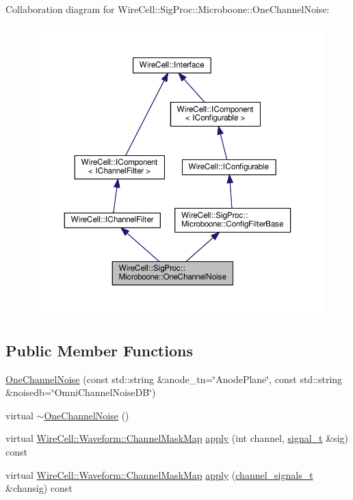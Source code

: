 Collaboration diagram for Wire\+Cell\+:\+:Sig\+Proc\+:\+:Microboone\+:\+:One\+Channel\+Noise\+:
\nopagebreak
\begin{figure}[H]
\begin{center}
\leavevmode
\includegraphics[width=350pt]{class_wire_cell_1_1_sig_proc_1_1_microboone_1_1_one_channel_noise__coll__graph}
\end{center}
\end{figure}
\subsection*{Public Member Functions}
\begin{DoxyCompactItemize}
\item 
\hyperlink{class_wire_cell_1_1_sig_proc_1_1_microboone_1_1_one_channel_noise_aaf3c3c811f5520e23128fd8d9f1b970e}{One\+Channel\+Noise} (const std\+::string \&anode\+\_\+tn=\char`\"{}Anode\+Plane\char`\"{}, const std\+::string \&noisedb=\char`\"{}Omni\+Channel\+Noise\+DB\char`\"{})
\item 
virtual \hyperlink{class_wire_cell_1_1_sig_proc_1_1_microboone_1_1_one_channel_noise_a00766844104785ac6fb769a1fd77771a}{$\sim$\+One\+Channel\+Noise} ()
\item 
virtual \hyperlink{namespace_wire_cell_1_1_waveform_a18b9ae61c858e340252ba3ac83ac3bc0}{Wire\+Cell\+::\+Waveform\+::\+Channel\+Mask\+Map} \hyperlink{class_wire_cell_1_1_sig_proc_1_1_microboone_1_1_one_channel_noise_a4d5cb537b5d9ca736fc1bbd3c463b76f}{apply} (int channel, \hyperlink{class_wire_cell_1_1_i_channel_filter_a434ed96cc4b805fa0eeec14f9f8d85e9}{signal\+\_\+t} \&sig) const
\item 
virtual \hyperlink{namespace_wire_cell_1_1_waveform_a18b9ae61c858e340252ba3ac83ac3bc0}{Wire\+Cell\+::\+Waveform\+::\+Channel\+Mask\+Map} \hyperlink{class_wire_cell_1_1_sig_proc_1_1_microboone_1_1_one_channel_noise_a89d35e0006bd5a44cdd046e2d9549fa4}{apply} (\hyperlink{class_wire_cell_1_1_i_channel_filter_a44de35ce47701d84cd45393c6bcd5e2f}{channel\+\_\+signals\+\_\+t} \&chansig) const
\end{DoxyCompactItemize}
